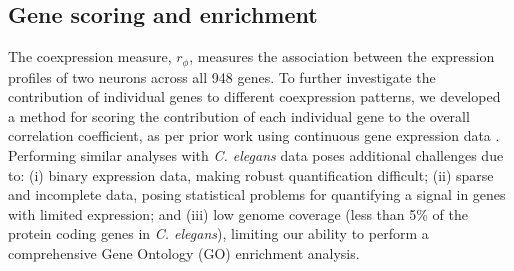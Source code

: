 \documentclass[10pt,letterpaper]{article}
\begin{document}

\subsection*{Gene scoring and enrichment}
The coexpression measure, $r_\phi$, measures the association between the expression profiles of two neurons across all 948 genes.
To further investigate the contribution of individual genes to different coexpression patterns, we developed a method for scoring the contribution of each individual gene to the overall correlation coefficient, as per prior work using continuous gene expression data \cite{Fulcher:2016ck}.
Performing similar analyses with \emph{C. elegans} data poses additional challenges due to:
(i) binary expression data, making robust quantification difficult;
(ii) sparse and incomplete data, posing statistical problems for quantifying a signal in genes with limited expression;
and (iii) low genome coverage (less than 5\% of the protein coding genes in \emph{C. elegans}), limiting our ability to perform a comprehensive Gene Ontology (GO) enrichment analysis.

\end{document}
